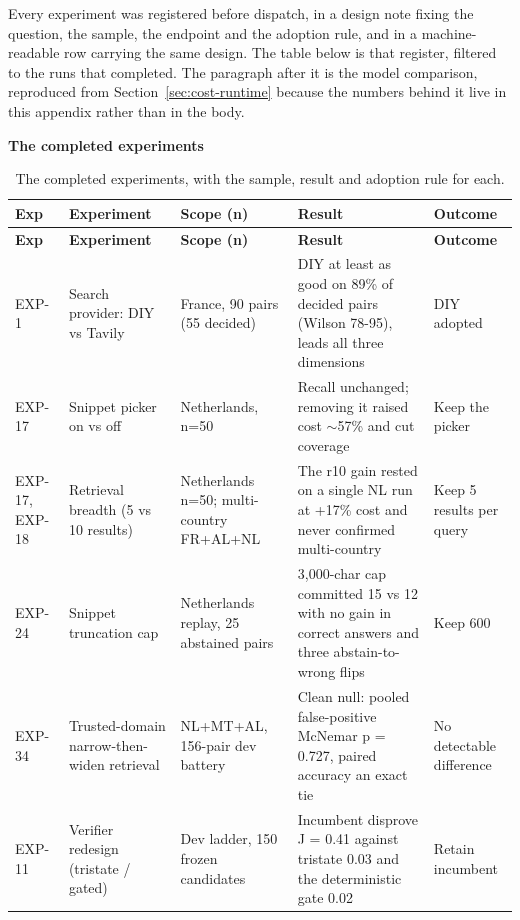 Every experiment was registered before dispatch, in a design note fixing the question, the sample, the endpoint and the adoption rule, and in a machine-readable row carrying the same design. The table below is that register, filtered to the runs that completed. The paragraph after it is the model comparison, reproduced from Section~\ref{sec:cost-runtime} because the numbers behind it live in this appendix rather than in the body.

\textbf{The completed experiments}

{\footnotesize
\begin{longtable}[]{@{}
  L{0.1106}
  L{0.2295}
  L{0.2428}
  L{0.2362}
  L{0.1808}@{}}
\caption{The completed experiments, with the sample, result and adoption rule for each.}\label{tab:experiments}\\
\toprule\noalign{}
\textbf{Exp} & \textbf{Experiment} & \textbf{Scope (n)} & \textbf{Result} & \textbf{Outcome} \\
\midrule\noalign{}
\endfirsthead
\toprule\noalign{}
\textbf{Exp} & \textbf{Experiment} & \textbf{Scope (n)} & \textbf{Result} & \textbf{Outcome} \\
\midrule\noalign{}
\endhead
\bottomrule\noalign{}
\endlastfoot
EXP-1 & Search provider: DIY vs Tavily & France, 90 pairs (55 decided) & DIY at least as good on 89\% of decided pairs (Wilson 78-95), leads all three dimensions & DIY adopted \\
EXP-17 & Snippet picker on vs off & Netherlands, n=50 & Recall unchanged; removing it raised cost $\sim$57\% and cut coverage & Keep the picker \\
EXP-17, EXP-18 & Retrieval breadth (5 vs 10 results) & Netherlands n=50; multi-country FR+AL+NL & The r10 gain rested on a single NL run at +17\% cost and never confirmed multi-country & Keep 5 results per query \\
EXP-24 & Snippet truncation cap & Netherlands replay, 25 abstained pairs & 3,000-char cap committed 15 vs 12 with no gain in correct answers and three abstain-to-wrong flips & Keep 600 \\
EXP-34 & Trusted-domain narrow-then-widen retrieval & NL+MT+AL, 156-pair dev battery & Clean null: pooled false-positive McNemar p = 0.727, paired accuracy an exact tie & No detectable difference \\
EXP-11 & Verifier redesign (tristate / gated) & Dev ladder, 150 frozen candidates & Incumbent disprove J = 0.41 against tristate 0.03 and the deterministic gate 0.02 & Retain incumbent \\

\end{longtable}}
